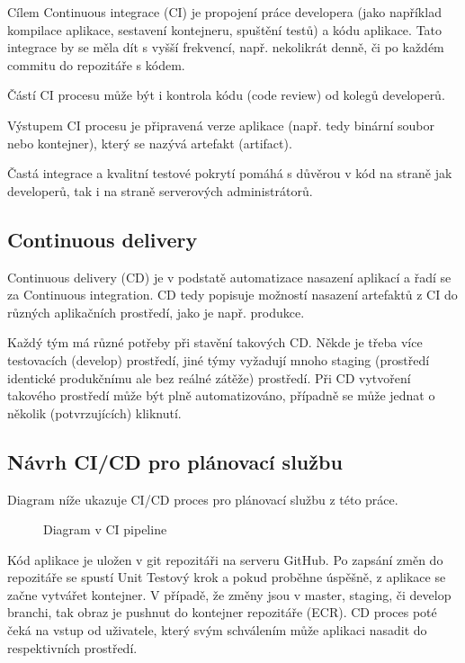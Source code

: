 \documentclass[thesis=M,czech]{FITthesis}[2019/12/23]
\theoremstyle{plain}
\theoremstyle{definition}
\begin{document}
Cílem Continuous integrace (CI) \cite{fowler-ci}je propojení práce developera (jako například kompilace aplikace, sestavení kontejneru, spuštění testů) a kódu aplikace. Tato integrace by se měla dít s vyšší frekvencí, např. nekolikrát denně, či po každém commitu do repozitáře s kódem.

Částí CI procesu může být i kontrola kódu (code review) od kolegů developerů.

Výstupem CI procesu je připravená verze aplikace (např. tedy binární soubor nebo kontejner), který se nazývá artefakt (artifact).


Častá integrace a kvalitní testové pokrytí pomáhá s důvěrou v kód na straně jak developerů, tak i na straně serverových administrátorů. 

\subsection{Continuous delivery}

Continuous delivery (CD) je v podstatě automatizace nasazení aplikací a řadí se za Continuous integration. CD tedy popisuje možností nasazení artefaktů z CI do různých aplikačních prostředí, jako je např. produkce.\cite{humble-ci}

Každý tým má různé potřeby při stavění takových CD. Někde je třeba více testovacích (develop) prostředí, jiné týmy vyžadují mnoho staging (prostředí identické produkčnímu ale bez reálné zátěže) prostředí. Při CD vytvoření takového prostředí může být plně automatizováno, případně se může jednat o několik (potvrzujících) kliknutí.


\subsection{Návrh CI/CD pro plánovací službu}

Diagram níže ukazuje CI/CD proces pro plánovací službu z této práce.



\begin{figure}[H]\centering
	

	\caption[Diagram v CI pipeline]{Diagram v CI pipeline}\label{fig:float}
\end{figure}

Kód aplikace je uložen v git repozitáři na serveru GitHub. Po zapsání změn do repozitáře se spustí Unit Testový krok a pokud proběhne úspěšně, z aplikace se začne vytvářet kontejner. V případě, že změny jsou v master, staging, či develop branchi, tak obraz je pushnut do kontejner repozitáře (ECR). CD proces poté čeká na vstup od uživatele, který svým schválením může aplikaci nasadit do respektivních prostředí.
\end{document}

